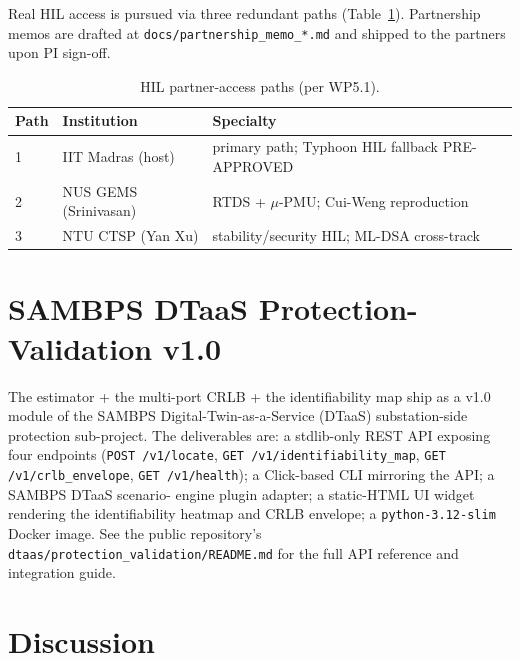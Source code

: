 \documentclass[journal]{IEEEtran}
\begin{document}
Real HIL access is pursued via three redundant paths
(Table~\ref{tab:hil_paths}).  Partnership memos are drafted at
\texttt{docs/partnership\_memo\_*.md} and shipped to the partners
upon PI sign-off.

\begin{table}[t]
\centering
\caption{HIL partner-access paths (per WP5.1).}
\label{tab:hil_paths}
\begin{tabular}{l l l}
\toprule
Path & Institution & Specialty \\
\midrule
1 & IIT Madras (host) & primary path; Typhoon HIL fallback PRE-APPROVED \\
2 & NUS GEMS (Srinivasan) & RTDS + $\mu$-PMU; Cui-Weng reproduction \\
3 & NTU CTSP (Yan Xu) & stability/security HIL; ML-DSA cross-track \\
\bottomrule
\end{tabular}
\end{table}

\section{SAMBPS DTaaS Protection-Validation v1.0}\label{sec:productisation}

The estimator + the multi-port CRLB + the identifiability map
ship as a v1.0 module of the SAMBPS Digital-Twin-as-a-Service
(DTaaS) substation-side protection sub-project.  The deliverables
are: a stdlib-only REST API exposing four endpoints
(\texttt{POST /v1/locate}, \texttt{GET /v1/identifiability\_map},
\texttt{GET /v1/crlb\_envelope}, \texttt{GET /v1/health}); a
Click-based CLI mirroring the API; a SAMBPS DTaaS scenario-
engine plugin adapter; a static-HTML UI widget rendering the
identifiability heatmap and CRLB envelope; a \texttt{python-3.12-slim}
Docker image.  See the public repository's
\texttt{dtaas/protection\_validation/README.md} for the full API
reference and integration guide.

\section{Discussion}\label{sec:discussion}
\end{document}
